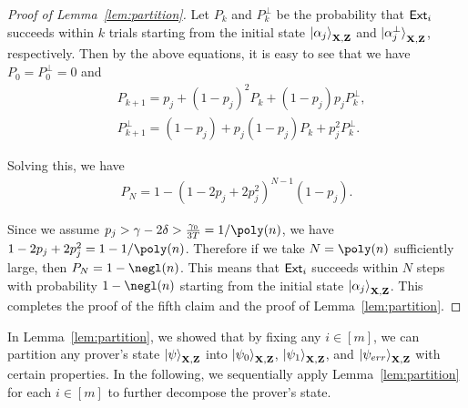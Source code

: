 \begin{proof}[Proof of Lemma~\ref{lem:partition}]
Let  $P_k$ and $P_k^\bot$ be the probability that $\mathsf{Ext}_i$ succeeds within $k$ trials starting from the initial state $\ket{\alpha_j}_{\mathbf{X},\mathbf{Z}}$   and $\ket{\alpha_j^\bot}_{\mathbf{X},\mathbf{Z}}$, respectively.
Then by the above equations, it is easy to see that we have $P_0=P_0^\bot=0$ and
\begin{align*}
&P_{k+1}=p_j+(1-p_j)^2 P_{k}+ (1-p_j)p_j P_{k}^\bot, \\
&P_{k+1}^\bot=(1-p_j)+ p_j(1-p_j) P_{k}+ p_j^2 P_{k}^\bot.
\end{align*}

Solving this, we have 
\begin{align*}
P_N=1-(1-2p_j+2p_j^2)^{N-1}(1-p_j).
\end{align*}

Since we assume $p_j> \gamma-2\delta>\frac{\gamma_0}{3T}=1/\poly(\secpar)$, we have $1-2p_j+2p_j^2=1-1/\poly(\secpar)$.
Therefore if we take $N=\poly(\secpar)$ sufficiently large, then $P_N=1-\negl(\secpar)$.
This means that $\mathsf{Ext}_i$ succeeds within $N$ steps with probability $1-\negl(\secpar)$ starting from the initial state $\ket{\alpha_j}_{\mathbf{X},\mathbf{Z}}$.
This completes the proof of the fifth claim and the proof of Lemma~\ref{lem:partition}. 
\end{proof}


In Lemma~\ref{lem:partition}, we showed that by fixing any $i\in [m]$, we can partition any prover's state $\ket{\psi}_{\mathbf{X},\mathbf{Z}}$ into $\ket{\psi_0}_{\mathbf{X},\mathbf{Z}}$, $\ket{\psi_1}_{\mathbf{X},\mathbf{Z}}$, and $\ket{\psi_{err}}_{\mathbf{X},\mathbf{Z}}$ with certain properties. %
In the following, we sequentially apply Lemma~\ref{lem:partition} for each $i\in[m]$ to further decompose the prover's state.




